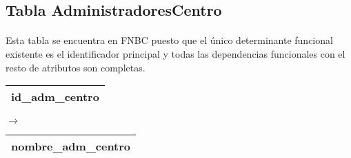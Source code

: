 \subsection{Tabla AdministradoresCentro}

  \paragraph{}Esta tabla se encuentra en FNBC puesto que el único determinante
  funcional existente es el identificador principal y todas las dependencias
  funcionales con el resto de atributos son completas.

  \begin{center}
    \begin{minipage}{3.7cm}{\begin{flushright}\begin{tabular}{ | c | }
                  \hline
                  id\_adm\_centro \\
                  \hline
                 \end{tabular}\end{flushright} }
    \end{minipage}
    \begin{minipage}{0.7cm}{$\longrightarrow$}
    \end{minipage}
    \begin{minipage}{5.9cm}{\begin{tabular}{ | c | }
                  \hline
                  nombre\_adm\_centro \\
                  \hline
                 \end{tabular} }
    \end{minipage}
  \end{center}
